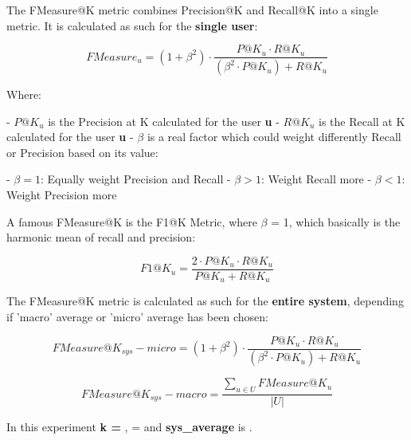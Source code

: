 \documentclass[12pt, a4paper]{article}
\begin{document}
\hfill\break\hfill\break
 The FMeasure@K metric combines Precision@K and Recall@K into a single metric.
 It is calculated as such for the
    \textbf{single user}:

    \[
    FMeasure_u = (1 + \beta^2) \cdot \frac{P@K_u \cdot R@K_u}{(\beta^2 \cdot P@K_u) + R@K_u}
    \]

    Where:

    - $P@K_u$ is the Precision at K calculated for the user \textbf{u}
    - $R@K_u$ is the Recall at K calculated for the user \textbf{u}
    - $\beta$ is a real factor which could weight differently Recall or Precision based on its value:

        - $\beta = 1$: Equally weight Precision and Recall
        - $\beta > 1$: Weight Recall more
        - $\beta < 1$: Weight Precision more

    A famous FMeasure@K is the F1@K Metric, where $\beta$ = 1, which basically is the harmonic mean of recall and
    precision:
    \hfill\break\hfill\break


    \[
    F1@K_u = \frac{2 \cdot P@K_u \cdot R@K_u}{P@K_u + R@K_u}
    \]

    The FMeasure@K metric is calculated as such for the \textbf{entire system}, depending if 'macro' average or 'micro'
    average has been chosen:

    \[
    FMeasure@K_{sys} - micro = (1 + \beta^2) \cdot \frac{P@K_u \cdot R@K_u}{(\beta^2 \cdot P@K_u) + R@K_u}
    \]

    \[
    FMeasure@K_{sys} - macro = \frac{\sum_{u \in U} FMeasure@K_u}{|U|}
    \]

\hfill\break
\hfill\break
In this experiment \textbf{k = },
\text{\boldmath$\beta$} = \textbf{} and
\textbf{sys\_average} is \textbf{}.

\end{document}
